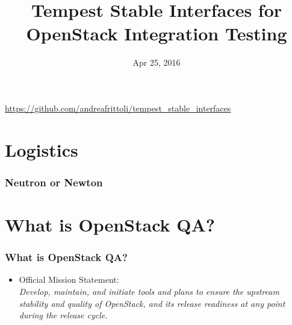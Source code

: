 \documentclass[aspectratio=169,11pt,hyperref={colorlinks=true}]{beamer}
\author[Andrea Frittoli]{%
    \texorpdfstring{
        \begin{columns}
            \column{.45\linewidth}
            \centering
            Andrea Frittoli\\
            \href{mailto:andrea.frittoli@hpe.com}{andrea.frittoli@hpe.com}\\
            \texttt{andreaf on Freenode}
        \end{columns}
   }
   {Andrea Frittoli}
}
\date{Apr 25, 2016}
\title[Tempest Stable Interfaces for OpenStack Integration Testing
\hspace{2em}\insertframenumber/\inserttotalframenumber]{Tempest Stable Interfaces for OpenStack Integration Testing}
\begin{document}
{
\begin{frame}[noframenumbering]
    \hypersetup{colorlinks,urlcolor=white}
    \titlepage{}
    \centering
    \href{https://github.com/andreafrittoli/tempest\_stable\_interfaces}{https://github.com/andreafrittoli/tempest\_stable\_interfaces}
\end{frame}
}

\section{Logistics}
\begin{frame}[c]
    \frametitle{Neutron or Newton}
    \begin{center}
        \Huge {}
    \end{center}
\end{frame}

\section{What is OpenStack QA?}
\begin{frame}
    \frametitle{What is OpenStack QA?}
    \begin{itemize}
     \item Official Mission Statement:\\
         \textit{Develop, maintain, and initiate tools and plans to ensure
the upstream stability and quality of OpenStack, and its release readiness at
any point during the release cycle.}
    \end{itemize}
\end{frame}
\end{document}
